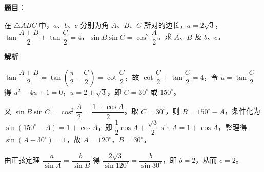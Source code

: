 \begin{answer}

\textbf{题目}：

在 $\triangle ABC$ 中，$a$、$b$、$c$ 分别为角 $A$、$B$、$C$ 所对的边长，$a=2\sqrt3$，$\tan\dfrac{A+B}2+\tan\dfrac C2=4$，$\sin B\sin C=\cos^2\dfrac A2$。求 $A$、$B$ 及 $b$、$c$。

\textbf{解析}

$\tan\dfrac{A+B}2=\tan\left(\dfrac\pi2-\dfrac C2\right)=\cot\dfrac C2$，故 $\cot\dfrac C2+\tan\dfrac C2=4$，令 $u=\tan\dfrac C2$ 得 $u^2-4u+1=0$，$u=2\pm\sqrt3$，即 $C=30^\circ$ 或 $150^\circ$。

又 $\sin B\sin C=\cos^2\dfrac A2=\dfrac{1+\cos A}2$。取 $C=30^\circ$，则 $B=150^\circ-A$，条件化为 $\sin(150^\circ-A)=1+\cos A$，即 $\dfrac12\cos A+\dfrac{\sqrt3}2\sin A=1+\cos A$，整理得 $\sin(A-30^\circ)=1$，故 $A=120^\circ$，$B=30^\circ$。

由正弦定理 $\dfrac a{\sin A}=\dfrac b{\sin B}$ 得 $\dfrac{2\sqrt3}{\sin120^\circ}=\dfrac b{\sin30^\circ}$，即 $b=2$，从而 $c=2$。


\end{answer}
